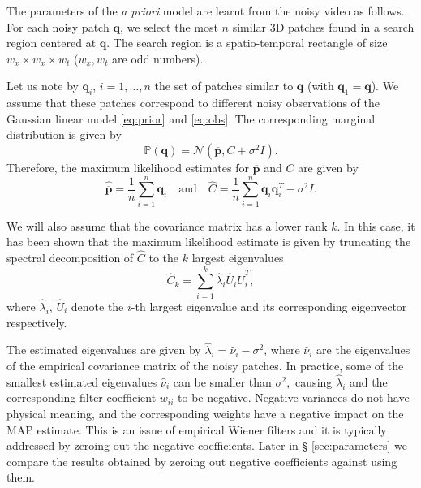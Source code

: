 \documentclass[10pt, a4paper]{article}
\newcommand{\pa}[1]{#1}
\newcommand{\padd}[1]{\pa{#1}}
\newcommand{\ma}[1]{\boldsymbol{#1}}
\begin{document}
The parameters of the \textit{a priori} model are learnt from the noisy video as
follows. For each noisy patch $\ma q$, we select the most $n$
similar 3D patches found in a search region centered at $\ma q$. The
search region is a spatio-temporal rectangle of size $w_x \times
w_x \times w_t$ ($w_x, w_t$ are odd numbers). 

Let us note by $\ma q_i$, $i = 1, \dots, n$ the set of patches
similar to $\ma q$ (with $\ma q_1 = \ma q$). We assume that these 
patches correspond to different noisy observations of the Gaussian linear model
\eqref{eq:prior} and \eqref{eq:obs}. The corresponding marginal distribution is given by
\[\mathds P(\ma q) = \mathcal N(\overline{\ma p}, C + \sigma^2I). \]
Therefore, the maximum likelihood estimates for $\overline{\ma p}$ and $C$ are given by 
\begin{equation}
	\widehat{\overline{\ma p}} = \frac1{n}\sum_{i = 1}^{n}\ma q_i \quad\text{and}\quad 
		\widehat C= \frac1n\sum_{i = 1}^{n}\ma q_i\ma q_i^T - \sigma^2I.
	\label{eq:learn_parameters}
\end{equation}

We will also assume that the covariance matrix has a lower rank $k$.  In this
case, it has been shown \cite{Tipping1999} that the maximum likelihood estimate is given by
truncating the spectral decomposition of $\widehat C$ to the $k$ largest
eigenvalues 
\begin{equation}
\widehat C_k = \sum_{i = 1}^k\widehat \lambda_i\widehat U_i\widehat U_i^T,
\end{equation}
where $\widehat \lambda_i$, $\widehat U_i$ denote the $i$-th largest
eigenvalue and its corresponding eigenvector respectively.

\padd{The estimated eigenvalues are given by $\widehat \lambda_i = \widehat
\nu_i - \sigma^2$, where $\widehat \nu_i$ are the eigenvalues of the empirical
covariance matrix of the noisy patches. In practice, some of the smallest
estimated eigenvalues $\widehat \nu_i$ can be smaller than $\sigma^2,$ causing
$\widehat \lambda_i$ and the corresponding filter coefficient $w_{ii}$ to be
negative. Negative variances do not have physical meaning, and the
corresponding weights have a negative impact on the MAP estimate. This is an
issue of empirical Wiener filters and it is typically addressed by zeroing out
the negative coefficients. Later in \S
\ref{sec:parameters} we compare the results obtained by zeroing out negative
coefficients against using them.}
\end{document}
